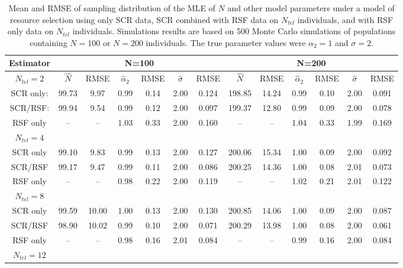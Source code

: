 \documentclass[12pt]{article}
\begin{document}
\begin{table}
\centering
\caption{Mean and RMSE of sampling distribution of the MLE of $N$ and
  other model parameters under a model of resource selection using
  only SCR data, SCR combined with RSF data on $N_{tel}$ individuals,
  and with RSF only data on $N_{tel}$ individuals. Simulations results
  are based on 500 Monte Carlo simulations of populations containing
  $N=100$ or $N=200$ individuals. The true parameter values were
  $\alpha_{2} = 1$ and $\sigma = 2$.
}
\begin{tabular}{ccccccccccccc}
\hline \hline
Estimator &  \multicolumn{6}{c}{N=100} & \multicolumn{6}{c}{N=200} \\
\hline
$N_{tel}=2$       &   $\hat{N}$ & RMSE & $\hat{\alpha}_{2}$& RMSE &
$\hat{\sigma}$ & RMSE & $\hat{N}$ & RMSE & $\hat{\alpha}_{2}$ & RMSE &
$\hat{\sigma}$ & RMSE \\ \hline
SCR only: &  99.73 & 9.97 & 0.99 & 0.14 & 2.00&  0.124& 198.85&14.24&0.99&   0.10& 2.00& 0.091 \\
SCR/RSF:  &  99.94 & 9.54 & 0.99 & 0.12 & 2.00&  0.097& 199.37&12.80&0.99&   0.09& 2.00& 0.078 \\
RSF only  &   --   & --   & 1.03 & 0.33 & 2.00&  0.160&   --  &   --&1.04&   0.33& 1.99& 0.169 \\
$N_{tel}=4$&        &      &      &      &     &       &       &      &    &       &     &      \\
SCR only  &  99.10 & 9.83 & 0.99 & 0.13 & 2.00&  0.127& 200.06& 15.34&1.00&   0.09& 2.00& 0.092\\
SCR/RSF   &  99.17 & 9.47 & 0.99 & 0.11 & 2.00&  0.086& 200.25& 14.36&1.00&   0.08& 2.01& 0.073\\
RSF only  &   --   &  --  & 0.98 & 0.22 & 2.00&  0.119&   --  &  --  &1.02&   0.21& 2.01& 0.122\\
$N_{tel}=8$&        &      &      &      &     &       &       &       &    &        &    &      \\
SCR only  &  99.59 & 10.00& 1.00 & 0.13 & 2.00&  0.130& 200.85& 14.06&1.00&   0.09& 2.00&   0.087\\
SCR/RSF   &  98.90 & 10.02&  0.99&  0.10& 2.00&  0.071& 200.29& 13.98&1.00&   0.08& 2.00&   0.061\\
RSF only  &   --   & --   & 0.98 & 0.16 & 2.01&  0.084&   --  &  --  &0.99&   0.16& 2.00&   0.084\\
$N_{tel}=12$&       &      &      &     &     &       &        &      &      &        &   &        \\

\end{tabular}
\end{table}
\end{document}

